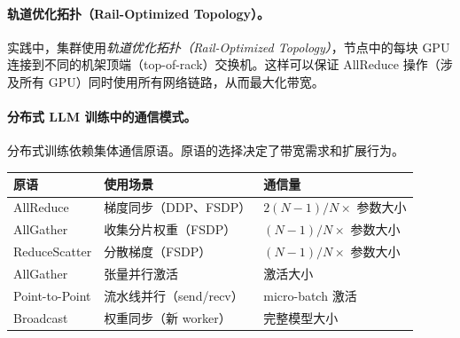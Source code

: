\paragraph{轨道优化拓扑（Rail-Optimized Topology）。}
\label{rail-optimized-topology.}

实践中，集群使用\emph{轨道优化拓扑（Rail-Optimized Topology）}，节点中的每块 GPU 连接到不同的机架顶端（top-of-rack）交换机。这样可以保证 AllReduce 操作（涉及所有 GPU）同时使用所有网络链路，从而最大化带宽。

\paragraph{分布式 LLM 训练中的通信模式。}
\label{communication-patterns-in-distributed-llm-training.}

分布式训练依赖集体通信原语。原语的选择决定了带宽需求和扩展行为。

\begin{keybox}[通信原语]
\begin{center}
\begin{tabular}{@{}l l l@{}}
\toprule
\textbf{原语} & \textbf{使用场景} & \textbf{通信量} \\
\midrule
AllReduce & 梯度同步（DDP、FSDP） & $2(N-1)/N \times$ 参数大小 \\
AllGather & 收集分片权重（FSDP） & $(N-1)/N \times$ 参数大小 \\
ReduceScatter & 分散梯度（FSDP） & $(N-1)/N \times$ 参数大小 \\
AllGather & 张量并行激活 & 激活大小 \\
Point-to-Point & 流水线并行（send/recv） & micro-batch 激活 \\
Broadcast & 权重同步（新 worker） & 完整模型大小 \\
\bottomrule
\end{tabular}
\end{center}
\end{keybox}

